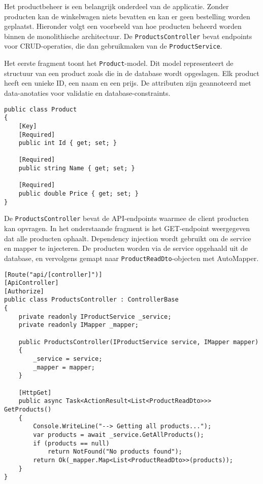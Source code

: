 Het productbeheer is een belangrijk onderdeel van de applicatie. Zonder producten kan de winkelwagen niets bevatten en kan er geen bestelling worden geplaatst. Hieronder volgt een voorbeeld van hoe producten beheerd worden binnen de monolithische architectuur. De \texttt{ProductsController} bevat endpoints voor CRUD-operaties, die dan gebruikmaken van de \texttt{ProductService}.

\medskip
Het eerste fragment toont het \texttt{Product}-model. Dit model representeert de structuur van een product zoals die in de database wordt opgeslagen. Elk product heeft een unieke ID, een naam en een prijs. De attributen zijn geannoteerd met data-anotaties voor validatie en database-constraints.
\medskip

\begin{lstlisting}[style=mystyleA, caption=Product.cs, label=lst:MonoProductModel]
public class Product
{
	[Key]
	[Required]
	public int Id { get; set; }
	
	[Required]
	public string Name { get; set; }
	
	[Required]
	public double Price { get; set; }
}
\end{lstlisting}

\medskip
De \texttt{ProductsController} bevat de API-endpoints waarmee de client producten kan opvragen. In het onderstaande fragment is het GET-endpoint weergegeven dat alle producten ophaalt. Dependency injection wordt gebruikt om de service en mapper te injecteren. De producten worden via de service opgehaald uit de database, en vervolgens gemapt naar \texttt{ProductReadDto}-objecten met AutoMapper.
\medskip

\begin{lstlisting}[style=mystyleA, caption=ProductsController.cs (fragment), label=lst:MonoProductsController]
[Route("api/[controller]")]
[ApiController]
[Authorize]
public class ProductsController : ControllerBase
{
	private readonly IProductService _service;
	private readonly IMapper _mapper;
	
	public ProductsController(IProductService service, IMapper mapper)
	{
		_service = service;
		_mapper = mapper;
	}
	
	[HttpGet]
	public async Task<ActionResult<List<ProductReadDto>>> GetProducts()
	{
		Console.WriteLine("--> Getting all products...");
		var products = await _service.GetAllProducts();
		if (products == null)
			return NotFound("No products found");
		return Ok(_mapper.Map<List<ProductReadDto>>(products));
	}
}
\end{lstlisting}


